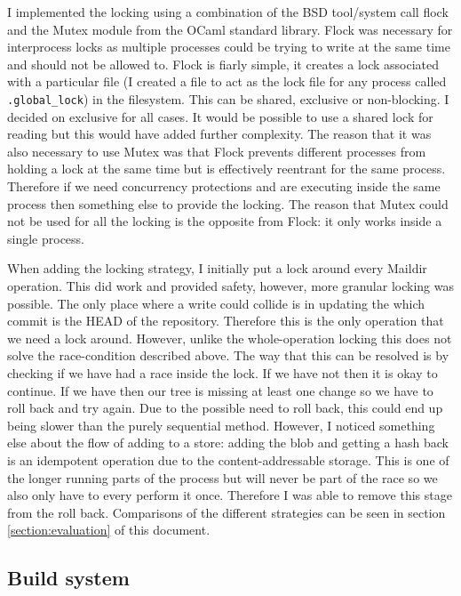 I implemented the locking using a combination of the BSD tool/system call flock\cite{manual_flock} and the Mutex module from the OCaml standard library. Flock was necessary for interprocess locks as multiple processes could be trying to write at the same time and should not be allowed to. Flock is fiarly simple, it creates a lock associated with a particular file (I created a file to act as the lock file for any process called \texttt{.global\_lock}) in the filesystem. This can be shared, exclusive or non-blocking. I decided on exclusive for all cases. It would be possible to use a shared lock for reading but this would have added further complexity. The reason that it was also necessary to use Mutex was that Flock prevents different processes from holding a lock at the same time but is effectively reentrant for the same process. Therefore if we need concurrency protections and are executing inside the same process then something else to provide the locking. The reason that Mutex could not be used for all the locking is the opposite from Flock: it only works inside a single process.

When adding the locking strategy, I initially put a lock around every Maildir operation. This did work and provided safety, however, more granular locking was possible. The only place where a write could collide is in updating the which commit is the HEAD of the repository. Therefore this is the only operation that we need a lock around. However, unlike the whole-operation locking this does not solve the race-condition described above. The way that this can be resolved is by checking if we have had a race inside the lock. If we have not then it is okay to continue. If we have then our tree is missing at least one change so we have to roll back and try again. Due to the possible need to roll back, this could end up being slower than the purely sequential method. However, I noticed something else about the flow of adding to a store: adding the blob and getting a hash back is an idempotent operation due to the content-addressable storage. This is one of the longer running parts of the process but will never be part of the race so we also only have to every perform it once. Therefore I was able to remove this stage from the roll back. Comparisons of the different strategies can be seen in section \ref{section:evaluation} of this document.

\subsection{Build system}

